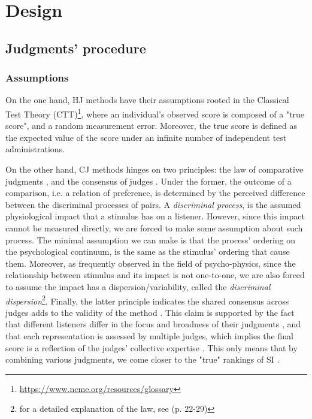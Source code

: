 \section{Design}
%
\subsection{Judgments' procedure}
%
\subsubsection{Assumptions}
%
On the one hand, HJ methods have their assumptions rooted in the Classical Test Theory (CTT)\footnote{\url{https://www.ncme.org/resources/glossary}}, where an individual's observed score is composed of a "true score", and a random measurement error. Moreover, the true score is defined as the expected value of the score under an infinite number of independent test administrations.

On the other hand, CJ methods hinges on two principles: the law of comparative judgments \citep{Thurstone_1927}, and the consensus of judges \citep{Lesterhuis_2018}. Under the former, the outcome of a comparison, i.e. a relation of preference, is determined by the perceived difference between the discriminal processes of pairs. A \textit{discriminal process}, is the assumed physiological impact that a stimulus has on a listener. However, since this impact cannot be measured directly, we are forced to make some assumption about such process. The minimal assumption we can make is that the process' ordering on the psychological continuum, is the same as the stimulus' ordering that cause them. Moreover, as frequently observed in the field of psycho-physics, since the relationship between stimulus and its impact is not one-to-one, we are also forced to assume the impact has a dispersion/variability, called the \textit{discriminal dispersion}\footnote{for a detailed explanation of the law, see \citet{Thurstone_1927, Verhavert_2018} (p. 22-29)}. Finally, the latter principle indicates the shared consensus across judges adds to the validity of the method \citep{Lesterhuis_2018}. This claim is supported by the fact that different listeners differ in the focus and broadness of their judgments \citep{Lesterhuis_2018}, and that each representation is assessed by multiple judges, which implies the final score is a reflection of the judges’ collective expertise \citep{Pollitt_2012b}. This only means that by combining various judgments, we come closer to the "true" rankings of SI \citep{Lee_et_al_2014}.
%
%
